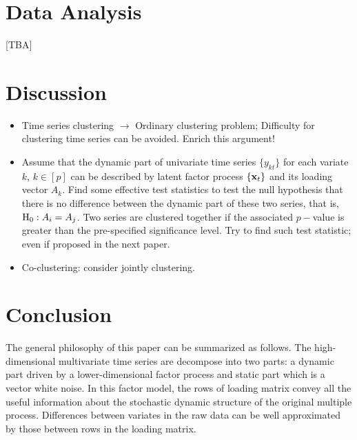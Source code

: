 \documentclass{statsoc}
\begin{document}
\section{Data Analysis}
[{\sf TBA}]
\section{Discussion}
\begin{itemize}
\item Time series clustering $\longrightarrow$ Ordinary clustering problem; Difficulty for clustering time series can be avoided. {\sf Enrich this argument!}
\item Assume that the dynamic part of univariate time series $\{y_{kt}\}$ for each variate $k$, $k\in[p]$ can be described by latent factor process $\{{\bf x}_t\}$ and its loading vector $A_k$. Find some effective test statistics to test the null hypothesis that there is no difference between the dynamic part of these two series, that is, ${\rm H}_0: A_i=A_j$. Two series are clustered together if the associated $p-$value is greater than the pre-specified significance level. {\sf Try to find such test statistic; even if proposed in the next paper.}
\item Co-clustering: consider jointly clustering. \citep{bc_05}
\end{itemize}
\section{Conclusion}
The general philosophy of this paper can be summarized as follows. The high-dimensional multivariate time series are decompose into two parts: a dynamic part driven by a lower-dimensional factor process and static part which is a vector white noise. In this factor model, the rows of loading matrix convey all the useful information about the stochastic dynamic structure of the original multiple process. Differences between variates in the raw data can be well approximated by those between rows in the loading matrix.


\end{document}
